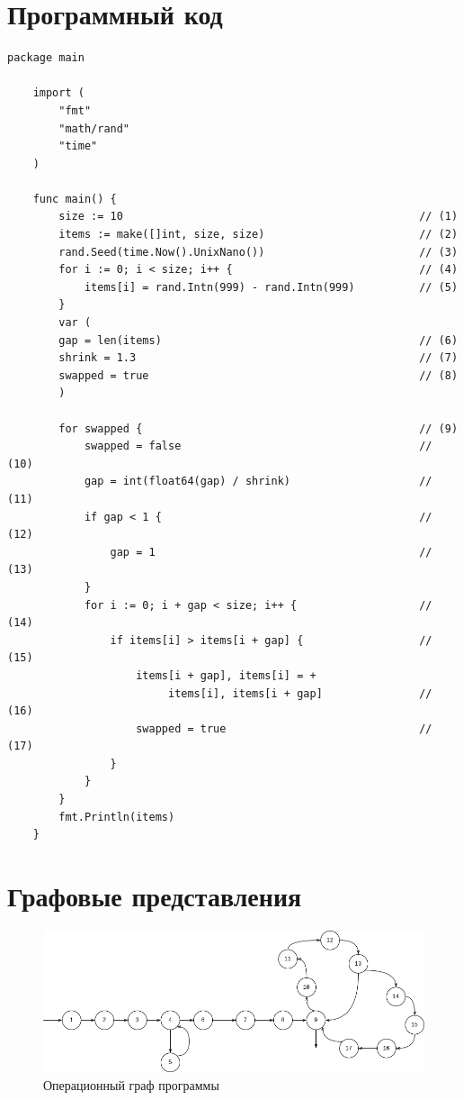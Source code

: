 \documentclass[14pt,a4paper]{scrreprt}
\begin{document}
	
	
	\captionsetup{singlelinecheck = false, justification=raggedright}
	\chapter{Программный код}
	\begin{lstlisting}[label=lst:comb,caption=Программный код]
	package main
	
	import (
		"fmt"
		"math/rand"
		"time"
	)
	
	func main() {    
		size := 10											    // (1)
		items := make([]int, size, size)					    // (2)
		rand.Seed(time.Now().UnixNano())					    // (3)
		for i := 0; i < size; i++ {							    // (4)
			items[i] = rand.Intn(999) - rand.Intn(999)		    // (5)
		}	              
		var (              
		gap = len(items)								        // (6)
		shrink = 1.3									        // (7)
		swapped = true									        // (8)			
		)              
		
		for swapped {										    // (9)
			swapped = false									    // (10)
			gap = int(float64(gap) / shrink)			        // (11)
			if gap < 1 {								        // (12)
				gap = 1										    // (13)
			}              
			for i := 0; i + gap < size; i++ {					// (14)
				if items[i] > items[i + gap] {				    // (15)
					items[i + gap], items[i] = +
						 items[i], items[i + gap]	  			// (16)
					swapped = true								// (17)
				}	
			}
		}
		fmt.Println(items)
	}
	\end{lstlisting}

\chapter{Графовые представления}

\begin{center}
	\begin{figure}[H]
		\captionsetup{singlelinecheck = false, justification=centering}
		\centering
		\includegraphics[width=0.9\linewidth]{assets/igraph.drawio.png}
		\caption{Операционный граф программы}
	\end{figure}
\end{center}
\end{document}
